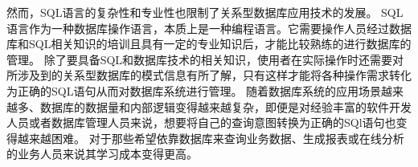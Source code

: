 



然而，SQL语言的复杂性和专业性也限制了关系型数据库应用技术的发展。
SQL语言作为一种数据库操作语言，本质上是一种编程语言。它需要操作人员经过数据库和SQL相关知识的培训且具有一定的专业知识后，才能比较熟练的进行数据库的管理。
除了要具备SQL和数据库技术的相关知识，使用者在实际操作时还需要对所涉及到的关系型数据库的模式信息有所了解，只有这样才能将各种操作需求转化为正确的SQL语句从而对数据库系统进行管理。
随着数据库系统的应用场景越来越多、数据库的数据量和内部逻辑变得越来越复杂，即便是对经验丰富的软件开发人员或者数据库管理人员来说，想要将自己的查询意图转换为正确的SQl语句也变得越来越困难。
对于那些希望依靠数据库来查询业务数据、生成报表或在线分析的业务人员来说其学习成本变得更高。

